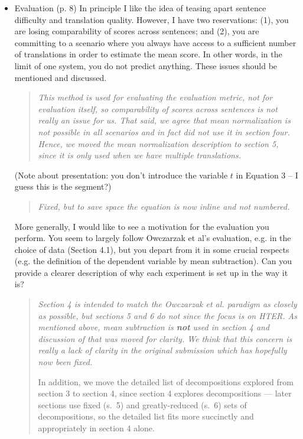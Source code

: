 \documentclass[letterpaper,12pt]{article}
\newenvironment{response}
{\begin{quotation} \it}
  {\end{quotation}}
\begin{document}
\begin{itemize}
\item  Evaluation (p. 8) In principle I like the idea of teasing apart
  sentence difficulty and translation quality. However, I have two
  reservations: (1), you are losing comparability of scores across
  sentences; and (2), you are committing to a scenario where you
  always have access to a sufficient number of translations in order
  to estimate the mean score. In other words, in the limit of one
  system, you do not predict anything.  These issues should be
  mentioned and discussed.  
  \begin{response}
    This method is used for evaluating the evaluation metric, not for
    evaluation itself, so comparability of scores across sentences is
    not really an issue for us.  That said, we agree that mean 
    normalization is not possible in all
    scenarios and in fact did not use it in section four.  Hence, we
    moved the mean normalization description to section 5, since it
    is only used when we have multiple translations.  
  \end{response}
  (Note about presentation: you don't
  introduce the variable $t$ in Equation 3 -- I guess this is the
  segment?)
  \begin{response}
    Fixed, but to save space the equation is now inline and not numbered.
  \end{response}
 
  More generally, I would like to see a motivation for the evaluation
  you perform. You seem to largely follow Owczarzak et al's
  evaluation, e.g. in the choice of data (Section 4.1), but you depart
  from it in some crucial respects (e.g. the definition of the
  dependent variable by mean subtraction). Can you provide a clearer
  description of why each experiment is set up in the way it is?
  \begin{response}
    Section 4 is intended to match the Owczarzak \textit{et al.} paradigm
    as closely as possible, but sections 5 and 6 do not since the focus 
    is on HTER. As mentioned above, mean subtraction is {\bf not} used 
    in section 4 and discussion of that was moved for clarity.  We think
    that this concern is really a lack of clarity in the original submission
    which has hopefully now been fixed.

    In addition, we move the detailed list of decompositions explored
    from section 3 to section 4, since section 4 explores
    decompositions --- later sections use fixed (s.~5) and
    greatly-reduced (s.~6) sets of decompositions, so the detailed
    list fits more succinctly and appropriately in section 4 alone.
  \end{response}


\end{itemize}
\end{document}
